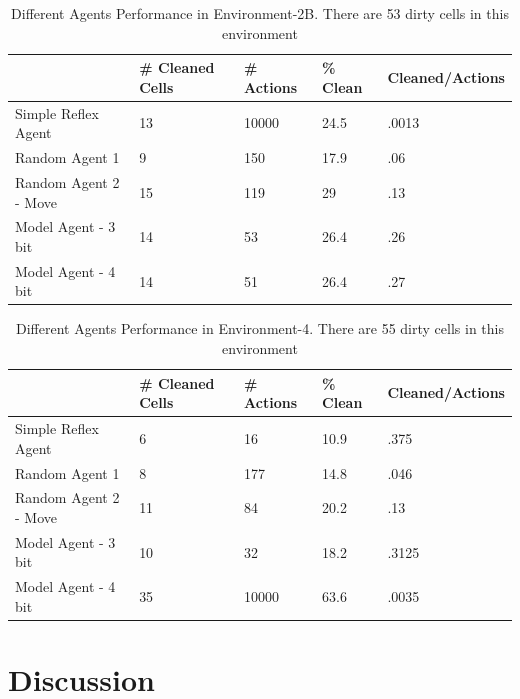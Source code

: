 \documentclass{article}
\begin{document}
\begin{table}[h!]
\centering
\caption{Different Agents Performance in Environment-2B. There are 53 dirty cells in this environment}
\label{my-label}
\begin{tabular}{l|ll|ll}
\hline
                    & \# Cleaned Cells & \# Actions  & \% Clean & Cleaned/Actions \\ \hline
Simple Reflex Agent 		& 13                  & 10000                  & 24.5     & .0013            \\ \hline
Random Agent 1       	& 9	         	& 150                & 17.9       & .06            \\ 
Random Agent 2 - Move 	& 15 			& 119		& 29 	& .13			\\ \hline
Model Agent - 3 bit		& 14                  & 53                & 26.4       & .26            \\ 
Model Agent - 4 bit		& 14                  & 51                & 26.4       & .27            \\ \hline
\end{tabular}
\end{table}

\begin{table}[h!]
\centering
\caption{Different Agents Performance in Environment-4. There are 55 dirty cells in this environment}
\label{my-label}
\begin{tabular}{l|ll|ll}
\hline
                    & \# Cleaned Cells & \# Actions  & \% Clean & Cleaned/Actions \\ \hline
Simple Reflex Agent 		& 6                  & 16                  & 10.9     & .375            \\ \hline
Random Agent 1       	& 8	         	& 177                & 14.8       & .046            \\ 
Random Agent 2 - Move 	& 11 			& 84		& 20.2 	& .13			\\ \hline
Model Agent - 3 bit		& 10                  & 32                & 18.2       & .3125            \\ 
Model Agent - 4 bit		& 35                  & 10000                & 63.6       & .0035            \\ \hline
\end{tabular}
\end{table}

\section{Discussion}
\end{document}
